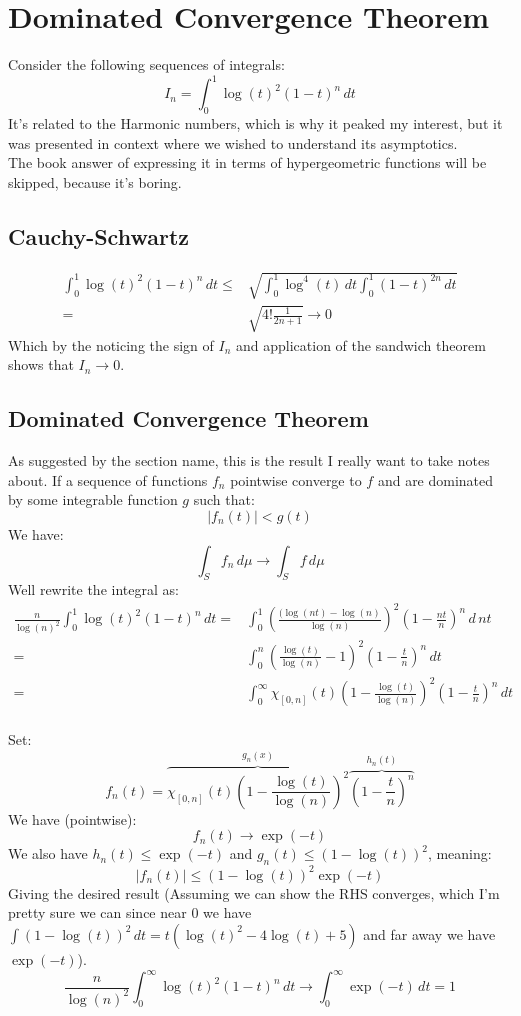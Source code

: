 
\section{Dominated Convergence Theorem}
Consider the following sequences of integrals:
\[I_n = \int_0^1\log(t)^2(1-t)^n\,dt\]
It's related to the Harmonic numbers,
which is why it peaked my interest,
but it was presented in context where we wished to understand its asymptotics.
\\

The book answer of expressing it in terms of hypergeometric functions will be skipped,
because it's boring.

\subsection{Cauchy-Schwartz}
\begin{equation*}
\begin{aligned}
\int_0^1\log(t)^2(1-t)^n\,dt \leq& \sqrt{\int_0^1\log^4(t)\,dt\int_0^1(1-t)^{2n}\,dt}\\
=&\sqrt{4! \frac{1}{2n+1}} \rightarrow 0
\end{aligned}
\end{equation*}
Which by the noticing the sign of $I_n$ and application of the sandwich theorem shows that $I_n \rightarrow 0$.

\subsection{Dominated Convergence Theorem}
As suggested by the section name, this is the result I really want to take notes about.
If a sequence of functions $f_n$ pointwise converge to $f$ and are dominated by some integrable function $g$ such that:
\[|f_n(t)| < g(t)\]
We have:
\[\int_S f_n\,d\mu \rightarrow \int_S f\,d\mu\]
Well rewrite the integral as:
\begin{equation*}
\begin{aligned}
\frac{n}{\log(n)^2}\int_0^1\log(t)^2(1-t)^n\,dt 
=& \int_0^1\left(\frac{(\log(nt)-\log(n)}{\log(n)}\right)^2\left(1-\frac{nt}{n}\right)^n\,d\,nt \\
=&\int_0^n\left(\frac{\log(t)}{\log(n)}-1\right)^2\left(1-\frac{t}{n}\right)^n\,dt \\
=& \int_0^\infty\chi_{[0,n]}(t)\left(1-\frac{\log(t)}{\log(n)}\right)^2\left(1-\frac{t}{n}\right)^n\,dt\\
\end{aligned}
\end{equation*}

Set:
\[f_n(t) = \overbrace{\chi_{[0,n]}(t)\left(1-\frac{\log(t)}{\log(n)}\right)^2}^{g_n(x)}\overbrace{\left(1-\frac{t}{n}\right)^n}^{h_n(t)}\]
We have (pointwise):
\[f_n(t) \rightarrow \exp(-t)\]
We also have $h_n(t) \leq \exp(-t)$ and $g_n(t) \leq (1-\log(t))^2$,
meaning:
\[|f_n(t)| \leq (1-\log(t))^2\exp(-t)\]
Giving the desired result
(Assuming we can show the RHS converges, 
which I'm pretty sure we can since near $0$ we have $\int (1-\log(t))^2\,dt = t(\log(t)^2-4\log(t)+5)$ and far away we have $\exp(-t)$).
\[\frac{n}{\log(n)^2}\int_0^\infty\log(t)^2(1-t)^n\,dt \rightarrow \int_0^\infty\exp(-t)\,dt = 1\]
